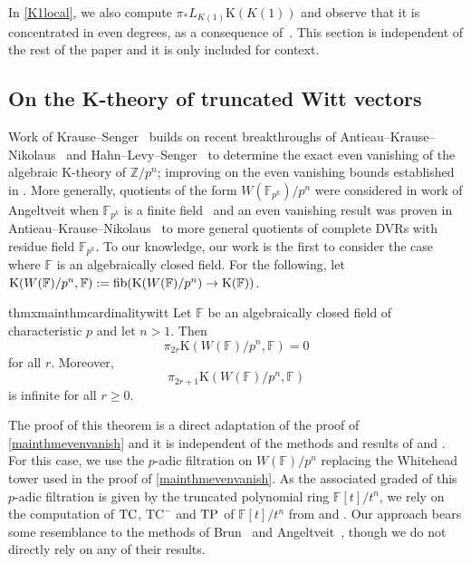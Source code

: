 \documentclass[english,10pt]{amsart}
\newcommand{\field}{\mathbb{F}}
\theoremstyle{definition}
\numberwithin{equation}{section}
\newcommand{\ntc}{\mathrm{TC}^{-}}
\DeclareMathOperator{\tp}{\ensuremath{\textup{TP}}}
\DeclareMathOperator{\tc}{\ensuremath{\textup{TC}}}
\begin{document}
In \autoref{K1local}, we also compute $\pi_*L_{K(1)}\mathrm{K}(K(1))$ and observe that it is concentrated in even degrees, as a consequence of~\cite{angeltveit2008thhofainftyringspectra,DR25}. This section is independent of the rest of the paper and it is only included for context.

\subsection{On the K-theory of truncated Witt vectors}\label{truncated Witt vectors}
Work of Krause--Senger~\cite{KS24} builds on recent breakthroughs of Antieau--Krause--Nikolaus~\cite{AKN24} and Hahn--Levy--Senger~\cite{HLS24} to determine the exact even vanishing of the algebraic K-theory of $\mathbb{Z}/p^n$; improving on the even vanishing bounds established in \cite[Theorem~1.4]{AKN24}. More generally, quotients of the form $W(\mathbb{F}_{p^k})/p^n$ were considered in work of Angeltveit when $\mathbb{F}_{p^k}$ is a finite field~\cite{Angeltveit2015kTheoryfinitewitt} and an even vanishing result was proven in Antieau--Krause--Nikolaus~\cite{AKN24} to more general quotients of complete DVRs with residue field $\mathbb{F}_{p^k}$. To our knowledge, our work is the first to consider the case where $\field$ is an algebraically closed field. For the following, let $\mathrm{K}(W(\field)/p^n,\field) := \textup{fib}(\mathrm{K}(W(\field)/p^n) \to \mathrm{K}(\field))$. 

\begin{restatable}{thmx}{mainthmcardinalitywitt}\label{theo k-theory of truncated witts is odd}
Let $\field$ be an algebraically closed field of characteristic $p$ and let $n>1$. Then 
\[\pi_{2r} \mathrm{K}(W(\field)/p^n,\field) = 0\]
for all $r$. Moreover,
\[\pi_{2r+1}\mathrm{K}(W(\field)/p^n,\field)\]
is infinite for all $r\geq 0$.
\end{restatable}

The proof of this theorem is a direct adaptation of the proof of \autoref{mainthmevenvanish} and it is independent of the methods and results of \cite{KS24} and \cite{AKN24}. For this case, we use the $p$-adic filtration on $W(\field)/p^n$ replacing the Whitehead tower used in the proof of \autoref{mainthmevenvanish}. As the associated graded of this $p$-adic filtration is given by the truncated polynomial ring $\field[t]/t^n$, we rely on the computation of $\tc$, $\ntc$ and $\tp$ of $\field[t]/t^n$ from \cite{hesselholt1997kthryoftruncated} and \cite{speirs2020truncatedpolynomial}. Our approach bears some resemblance to the methods of Brun~\cite{Bru00,Bru01} and Angeltveit~\cite{Angeltveit2015kTheoryfinitewitt}, though we do not directly rely on any of their results. 
\end{document}
